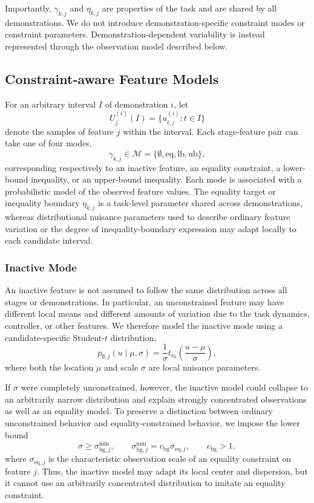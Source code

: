 \documentclass[lettersize,journal]{IEEEtran}
\begin{document}
Importantly, $\gamma_{k,j}$ and $\eta_{k,j}$ are properties of the task and are shared by all demonstrations. We do not introduce demonstration-specific constraint modes or constraint parameters. Demonstration-dependent variability is instead represented through the observation model described below.
\subsection{Constraint-aware Feature Models}

For an arbitrary interval $I$ of demonstration $i$, let
\[
U_j^{(i)}(I)
=
\{u_{t,j}^{(i)}:t\in I\}
\]
denote the samples of feature $j$ within the interval. Each stage-feature pair can take one of four modes,
\[
\gamma_{k,j}
\in
\mathcal{M}
=
\{\emptyset,\mathrm{eq},\mathrm{lb},\mathrm{ub}\},
\]
corresponding respectively to an inactive feature, an equality constraint, a lower-bound inequality, or an upper-bound inequality. Each mode is associated with a probabilistic model of the observed feature values. The equality target or inequality boundary $\eta_{k,j}$ is a task-level parameter shared across demonstrations, whereas distributional nuisance parameters used to describe ordinary feature variation or the degree of inequality-boundary expression may adapt locally to each candidate interval.

\subsubsection{Inactive Mode}

An inactive feature is not assumed to follow the same distribution across all stages or demonstrations. In particular, an unconstrained feature may have different local means and different amounts of variation due to the task dynamics, controller, or other features. We therefore model the inactive mode using a candidate-specific Student-$t$ distribution,
\[
p_{\emptyset,j}
\left(
u\mid \mu,\sigma
\right)
=
\frac{1}{\sigma}
t_{\nu_0}
\left(
\frac{u-\mu}{\sigma}
\right),
\]
where both the location $\mu$ and scale $\sigma$ are local nuisance parameters.

If $\sigma$ were completely unconstrained, however, the inactive model could collapse to an arbitrarily narrow distribution and explain strongly concentrated observations as well as an equality model. To preserve a distinction between ordinary unconstrained behavior and equality-constrained behavior, we impose the lower bound
\[
\sigma
\ge
\sigma_{\mathrm{bg},j}^{\min},
\qquad
\sigma_{\mathrm{bg},j}^{\min}
=
c_{\mathrm{bg}}\sigma_{\mathrm{eq},j},
\qquad
c_{\mathrm{bg}}>1,
\]
where $\sigma_{\mathrm{eq},j}$ is the characteristic observation scale of an equality constraint on feature $j$. Thus, the inactive model may adapt its local center and dispersion, but it cannot use an arbitrarily concentrated distribution to imitate an equality constraint.
\end{document}
